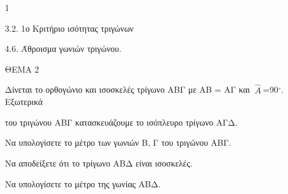 \begin{ylh}{1}
    \item 3.2. 1ο Κριτήριο ισότητας τριγώνων
    \item 4.6. Άθροισμα γωνιών τριγώνου.
\end{ylh}

ΘΕΜΑ 2

Δίνεται το ορθογώνιο και ισοσκελές τρίγωνο ΑΒΓ με ΑΒ = ΑΓ και $\ \widehat{Α}\ $=90${^\circ}$. Εξωτερικά

του τριγώνου ΑΒΓ κατασκευάζουμε το ισόπλευρο τρίγωνο ΑΓΔ.

\begin{alist}
\item Nα υπολογίσετε το μέτρο των γωνιών Β, Γ του τριγώνου ΑΒΓ. 

\item Να αποδείξετε ότι το τρίγωνο ΑΒΔ είναι ισοσκελές. 

\item Να υπολογίσετε το μέτρο της γωνίας ΑΒΔ. 


\begin{center}
\end{center}
\end{alist}
